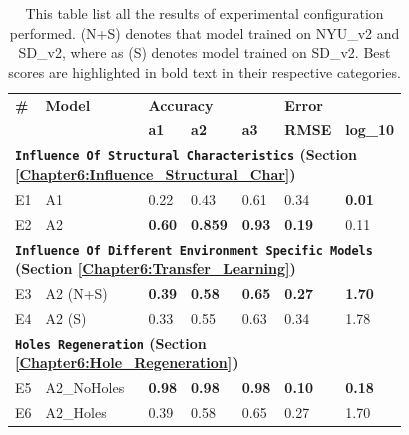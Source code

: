 \bgroup
\def\arraystretch{1.35}%
\begin{table}[h]
\begin{tabular}{p{0.05\linewidth}p{0.3\linewidth}p{0.1\linewidth}p{0.1\linewidth}p{0.08\linewidth}p{0.08\linewidth}p{0.07\linewidth}}
\hline
\textbf{\#} & \textbf{Model} & \multicolumn{3}{l}{\textbf{Accuracy}} & \multicolumn{2}{l}{\textbf{Error}} \\ \cline{3-7} 
                    &                        & \textbf{a1}       & \textbf{a2}       & \textbf{a3}      & \textbf{RMSE}         & \textbf{log\_10}      \\ \hline\hline
\multicolumn{7}{l}{\textbf{\texttt{Influence Of Structural Characteristics} (Section \ref{Chapter6:Influence_Structural_Char})}}                                            \\ \hline
E1                 &  A1  & 0.22         & 0.43          &  0.61       & 0.34            &   \textbf{0.01}           \\ \hline
E2                  & A2  &   \textbf{0.60}  & \textbf{0.859} & \textbf{0.93}      &  \textbf{0.19}          &0.11              \\ \hline 
\multicolumn{7}{l}{\textbf{\texttt{Influence Of Different Environment Specific Models} (Section \ref{Chapter6:Transfer_Learning})}}                                                                   \\ \hline
{E3}                  & {A2} (N+S)              & \textbf{0.39}   & \textbf{0.58}   & \textbf{0.65}  & \textbf{0.27}      & \textbf{1.70}       \\ \hline
{E4}                  & {A2} (S) & 0.33   & 0.55   & 0.63  & 0.34      & 1.78       \\ \hline
\multicolumn{7}{l}{\textbf{\texttt{Holes Regeneration} (Section \ref{Chapter6:Hole_Regeneration})}}                                                       \\ \hline
{E5}                  & {A2\_NoHoles}            & \textbf{0.98}   & \textbf{0.98}   & \textbf{0.98}  & \textbf{0.10}       & \textbf{0.18}        \\ \hline
{E6}                  & {A2\_Holes}              & 0.39   & 0.58   & 0.65  & 0.27      & 1.70       \\ \hline
\end{tabular}

\caption{This table list all the results of experimental configuration performed. (N+S) denotes that model trained on NYU\_v2 and SD\_v2, where as (S) denotes model trained on SD\_v2. Best scores are highlighted in bold text in their respective categories.}
\label{table:Results_main}
\end{table}
\egroup

